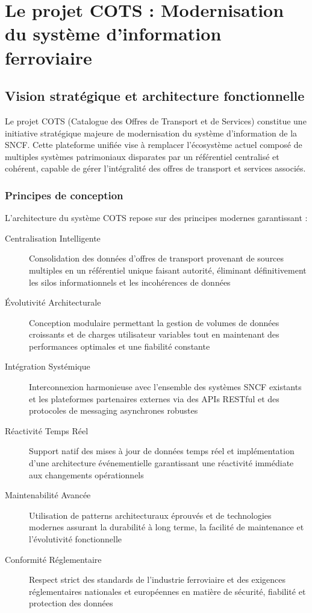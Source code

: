 \section{Le projet COTS : Modernisation du système d'information ferroviaire}

\subsection{Vision stratégique et architecture fonctionnelle}

Le projet COTS (Catalogue des Offres de Transport et de Services) constitue une initiative stratégique majeure de modernisation du système d'information de la SNCF. Cette plateforme unifiée vise à remplacer l'écosystème actuel composé de multiples systèmes patrimoniaux disparates par un référentiel centralisé et cohérent, capable de gérer l'intégralité des offres de transport et services associés.

\subsubsection{Principes de conception}

L'architecture du système COTS repose sur des principes modernes garantissant :

\begin{description}
    \item[Centralisation Intelligente] Consolidation des données d'offres de transport provenant de sources multiples en un référentiel unique faisant autorité, éliminant définitivement les silos informationnels et les incohérences de données
    \item[Évolutivité Architecturale] Conception modulaire permettant la gestion de volumes de données croissants et de charges utilisateur variables tout en maintenant des performances optimales et une fiabilité constante
    \item[Intégration Systémique] Interconnexion harmonieuse avec l'ensemble des systèmes SNCF existants et les plateformes partenaires externes via des APIs RESTful et des protocoles de messaging asynchrones robustes
    \item[Réactivité Temps Réel] Support natif des mises à jour de données temps réel et implémentation d'une architecture événementielle garantissant une réactivité immédiate aux changements opérationnels
    \item[Maintenabilité Avancée] Utilisation de patterns architecturaux éprouvés et de technologies modernes assurant la durabilité à long terme, la facilité de maintenance et l'évolutivité fonctionnelle
    \item[Conformité Réglementaire] Respect strict des standards de l'industrie ferroviaire et des exigences réglementaires nationales et européennes en matière de sécurité, fiabilité et protection des données
\end{description}

